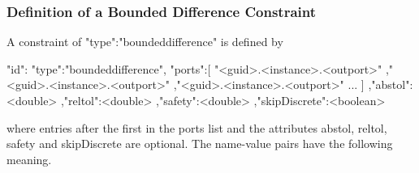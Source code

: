 	\subsubsection{Definition of a Bounded Difference Constraint}\label{sec:bdconstraint}
	A constraint of {\ttfamily "type":"boundeddifference"} is defined by
	
	\begin{json}
		"id":{
			"type":"boundeddifference",
			"ports":[
			"<guid>.<instance>.<outport>"
			,"<guid>.<instance>.<outport>"
			,"<guid>.<instance>.<outport>"
			...
			]
			,"abstol":<double>
			,"reltol":<double>
			,"safety":<double>
			,"skipDiscrete":<boolean>
		}
	\end{json}
	
	\noindent where entries after the first in the {\ttfamily ports} list and the attributes {\ttfamily abstol}, {\ttfamily reltol}, {\ttfamily safety} and {\ttfamily skipDiscrete} are optional. The name-value pairs have the following meaning.
	
